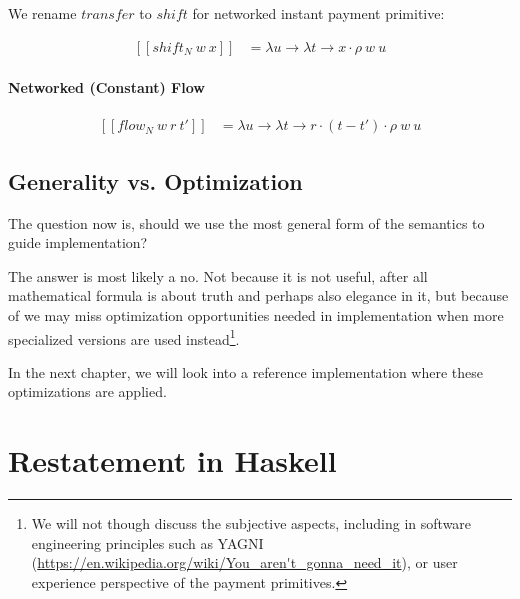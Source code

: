 We rename $transfer$ to $shift$ for networked instant payment primitive:

\begin{equation}
    \begin{split}
        [\![shift_N\ w\ x]\!] &=
        \lambda u \rightarrow \lambda t \rightarrow x \cdot \rho\ w\ u
    \end{split}
\end{equation}

\paragraph{Networked (Constant) Flow}

\begin{equation}
    \begin{split}
        [\![flow_N\ w\ r\ t']\!] &=
        \lambda u \rightarrow \lambda t \rightarrow r \cdot (t - t') \cdot \rho\ w\ u
    \end{split}
\end{equation}

\subsection{Generality vs. Optimization}

The question now is, should we use the most general form of the semantics to guide implementation?

The answer is most likely a no. Not because it is not useful, after all mathematical formula is about truth and perhaps
also elegance in it, but because of we may miss optimization opportunities needed in implementation when more
specialized versions are used instead\footnote{We will not though discuss the subjective aspects, including in software
engineering principles such as YAGNI (\url{https://en.wikipedia.org/wiki/You_aren't_gonna_need_it}), or user experience
perspective of the payment primitives.}.

In the next chapter, we will look into a reference implementation where these optimizations are applied.

\section{Restatement in Haskell}



